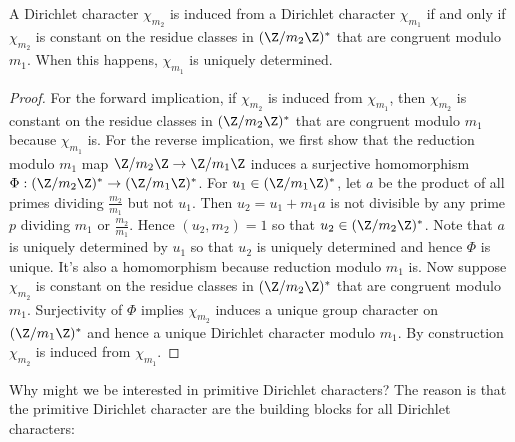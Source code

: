       \begin{proposition}\label{prop:Dirichlet_character_induction_classification}
        A Dirichlet character $\chi_{m_{2}}$ is induced from a Dirichlet character $\chi_{m_{1}}$ if and only if $\chi_{m_{2}}$ is constant on the residue classes in $(\Z/m_{2}\Z)^{\ast}$ that are congruent modulo $m_{1}$. When this happens, $\chi_{m_{1}}$ is uniquely determined.
      \end{proposition}
      \begin{proof}
        For the forward implication, if $\chi_{m_{2}}$ is induced from $\chi_{m_{1}}$, then $\chi_{m_{2}}$ is constant on the residue classes in $(\Z/m_{2}\Z)^{\ast}$ that are congruent modulo $m_{1}$ because $\chi_{m_{1}}$ is. For the reverse implication, we first show that the reduction modulo $m_{1}$ map $\Z/m_{2}\Z \to \Z/m_{1}\Z$ induces a surjective homomorphism $\Phi:(\Z/m_{2}\Z)^{\ast} \to (\Z/m_{1}\Z)^{\ast}$. For $u_{1} \in (\Z/m_{1}\Z)^{\ast}$, let $a$ be the product of all primes dividing $\frac{m_{2}}{m_{1}}$ but not $u_{1}$. Then $u_{2} = u_{1}+m_{1}a$ is not divisible by any prime $p$ dividing $m_{1}$ or $\frac{m_{2}}{m_{1}}$. Hence $(u_{2},m_{2}) = 1$ so that $u_{2} \in (\Z/m_{2}\Z)^{\ast}$. Note that $a$ is uniquely determined by $u_{1}$ so that $u_{2}$ is uniquely determined and hence $\Phi$ is unique. It's also a homomorphism because reduction modulo $m_{1}$ is. Now suppose $\chi_{m_{2}}$ is constant on the residue classes in $(\Z/m_{2}\Z)^{\ast}$ that are congruent modulo $m_{1}$. Surjectivity of $\Phi$ implies $\chi_{m_{2}}$ induces a unique group character on $(\Z/m_{1}\Z)^{\ast}$ and hence a unique Dirichlet character modulo $m_{1}$. By construction $\chi_{m_{2}}$ is induced from $\chi_{m_{1}}$.
      \end{proof}

      Why might we be interested in primitive Dirichlet characters? The reason is that the primitive Dirichlet character are the building blocks for all Dirichlet characters:

